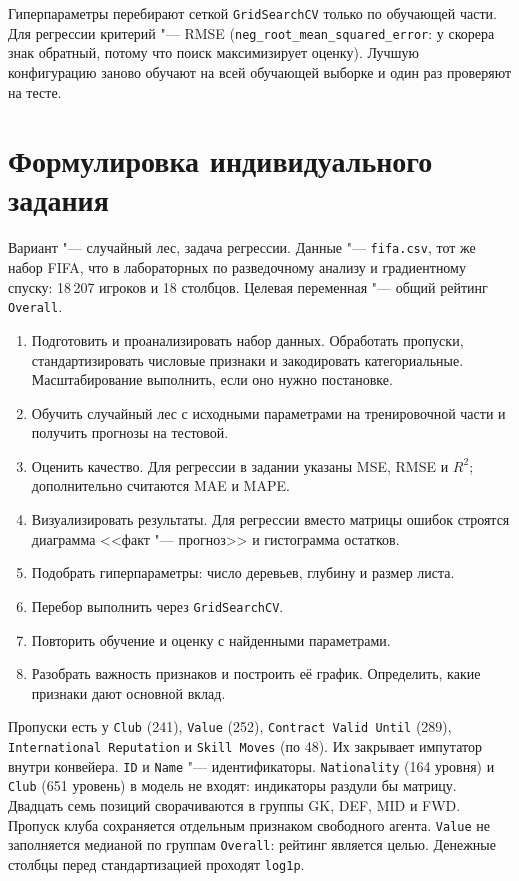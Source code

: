 \documentclass[14pt]{extarticle}
\begin{document}
Гиперпараметры перебирают сеткой \texttt{GridSearchCV} только по обучающей части. Для регрессии критерий "--- RMSE (\texttt{neg\_root\_mean\_squared\_error}: у скорера знак обратный, потому что поиск максимизирует оценку). Лучшую конфигурацию заново обучают на всей обучающей выборке и один раз проверяют на тесте.

\section{Формулировка индивидуального задания}

Вариант "--- случайный лес, задача регрессии. Данные "--- \texttt{fifa.csv}, тот же набор FIFA, что в лабораторных по разведочному анализу и градиентному спуску: 18\,207 игроков и 18 столбцов. Целевая переменная "--- общий рейтинг \texttt{Overall}.

\begin{enumerate}
\item Подготовить и проанализировать набор данных. Обработать пропуски, стандартизировать числовые признаки и закодировать категориальные. Масштабирование выполнить, если оно нужно постановке.
\item Обучить случайный лес с исходными параметрами на тренировочной части и получить прогнозы на тестовой.
\item Оценить качество. Для регрессии в задании указаны MSE, RMSE и $R^2$; дополнительно считаются MAE и MAPE.
\item Визуализировать результаты. Для регрессии вместо матрицы ошибок строятся диаграмма <<факт "--- прогноз>> и гистограмма остатков.
\item Подобрать гиперпараметры: число деревьев, глубину и размер листа.
\item Перебор выполнить через \texttt{GridSearchCV}.
\item Повторить обучение и оценку с найденными параметрами.
\item Разобрать важность признаков и построить её график. Определить, какие признаки дают основной вклад.
\end{enumerate}

Пропуски есть у \texttt{Club} (241), \texttt{Value} (252), \texttt{Contract Valid Until} (289), \texttt{International Reputation} и \texttt{Skill Moves} (по 48). Их закрывает импутатор внутри конвейера. \texttt{ID} и \texttt{Name} "--- идентификаторы. \texttt{Nationality} (164 уровня) и \texttt{Club} (651 уровень) в модель не входят: индикаторы раздули бы матрицу. Двадцать семь позиций сворачиваются в группы GK, DEF, MID и FWD. Пропуск клуба сохраняется отдельным признаком свободного агента. \texttt{Value} не заполняется медианой по группам \texttt{Overall}: рейтинг является целью. Денежные столбцы перед стандартизацией проходят \texttt{log1p}.
\end{document}
